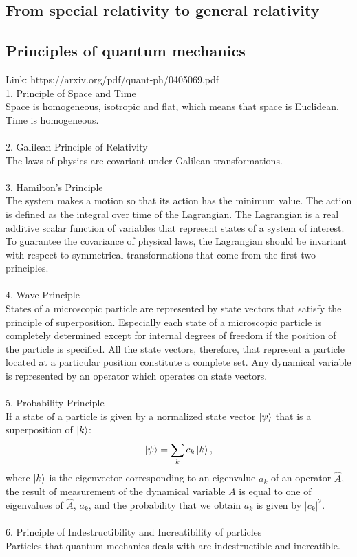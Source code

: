 \documentclass[12pt]{article}
\begin{document}
\subsection{From special relativity to general relativity}






\subsection{Principles of quantum mechanics}
Link: https://arxiv.org/pdf/quant-ph/0405069.pdf\\
1. Principle of Space and Time\\
Space is homogeneous, isotropic and flat, which means that space is Euclidean.
Time is homogeneous.
\\ \\
2. Galilean Principle of Relativity\\
The laws of physics are covariant under Galilean transformations.
\\ \\
3. Hamilton’s Principle\\
The system makes a motion so that its action has the minimum value. The
action is defined as the integral over time of the Lagrangian. The Lagrangian is
a real additive scalar function of variables that represent states of a system of
interest. To guarantee the covariance of physical laws, the Lagrangian should be
invariant with respect to symmetrical transformations that come from the first
two principles.
\\ \\
4. Wave Principle\\
States of a microscopic particle are represented by state vectors that satisfy
the principle of superposition. Especially each state of a microscopic particle is
completely determined except for internal degrees of freedom if the position of
the particle is specified. All the state vectors, therefore, that represent a particle
located at a particular position constitute a complete set. Any dynamical variable
is represented by an operator which operates on state vectors.
\\ \\
5. Probability Principle\\
If a state of a particle is given by a normalized state vector $\ket{\psi}$ that is a
superposition of $\ket{k}$:
$$\ket{\psi} = \sum_{k}c_k\ket{k},$$
where $\ket{k}$ is the eigenvector corresponding to an eigenvalue $a_k$ of an operator $\hat{A}$, the result of measurement of the dynamical variable $A$ is equal to one of 
eigenvalues of $\hat{A}$, $a_k$, and the probability that we obtain $a_k$ is given by $|c_k|^2$.
\\ \\
6. Principle of Indestructibility and Increatibility of particles\\
Particles that quantum mechanics deals with are indestructible and increatible.
\end{document}
